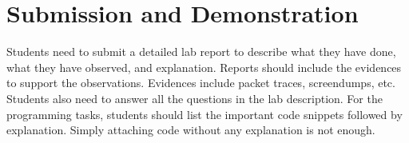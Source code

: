 \section{Submission and Demonstration}


Students need to submit a detailed lab report to describe what they have
done, what they have observed, and explanation. Reports should include the evidences to support
the observations. Evidences include packet traces, screendumps, etc.
Students also need to answer all the questions in the lab description.
For the programming tasks, students should list the important code snippets followed by
explanation. Simply attaching code without any explanation is not enough.




\vspace{.2in}





